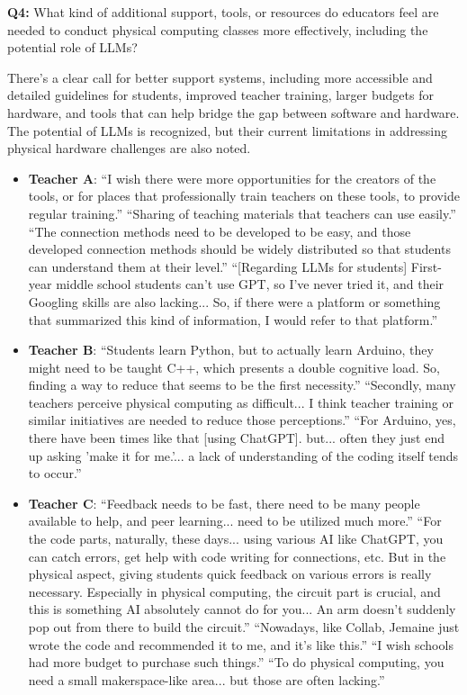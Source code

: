 \documentclass{article} %
\begin{document}
\vspace{1em}
\textbf{Q4:} What kind of additional support, tools, or resources do educators feel are needed to conduct physical computing classes more effectively, including the potential role of LLMs?
\begin{summarybox}
There's a clear call for better support systems, including more accessible and detailed guidelines for students, improved teacher training, larger budgets for hardware, and tools that can help bridge the gap between software and hardware. The potential of LLMs is recognized, but their current limitations in addressing physical hardware challenges are also noted.
    \begin{itemize}[itemsep=0em, topsep=0.5em, labelsep=0.5em, leftmargin=0.5em]
    \item \textbf{Teacher A}: ``I wish there were more opportunities for the creators of the tools, or for places that professionally train teachers on these tools, to provide regular training.''  ``Sharing of teaching materials that teachers can use easily.''  ``The connection methods need to be developed to be easy, and those developed connection methods should be widely distributed so that students can understand them at their level.''  ``[Regarding LLMs for students] First-year middle school students can't use GPT, so I've never tried it, and their Googling skills are also lacking... So, if there were a platform or something that summarized this kind of information, I would refer to that platform.''
    \item \textbf{Teacher B}: ``Students learn Python, but to actually learn Arduino, they might need to be taught C++, which presents a double cognitive load. So, finding a way to reduce that seems to be the first necessity.''  ``Secondly, many teachers perceive physical computing as difficult... I think teacher training or similar initiatives are needed to reduce those perceptions.''  ``For Arduino, yes, there have been times like that [using ChatGPT]. but... often they just end up asking 'make it for me.'... a lack of understanding of the coding itself tends to occur.''
    \item \textbf{Teacher C}: ``Feedback needs to be fast, there need to be many people available to help, and peer learning... need to be utilized much more.''  ``For the code parts, naturally, these days... using various AI like ChatGPT, you can catch errors, get help with code writing for connections, etc. But in the physical aspect, giving students quick feedback on various errors is really necessary. Especially in physical computing, the circuit part is crucial, and this is something AI absolutely cannot do for you... An arm doesn't suddenly pop out from there to build the circuit.''  ``Nowadays, like Collab, Jemaine just wrote the code and recommended it to me, and it's like this.'' ``I wish schools had more budget to purchase such things.''  ``To do physical computing, you need a small makerspace-like area... but those are often lacking.''

\end{itemize}
\end{summarybox}
\end{document}
